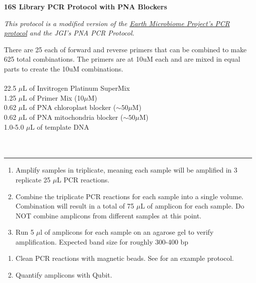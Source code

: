 \documentclass[11pt]{article}
\begin{document}
\begin{center}
\textbf{\large{16S Library PCR Protocol with PNA Blockers}}
\break

\emph{This protocol is a modified version of the \href{http://www.earthmicrobiome.org/emp-standard-protocols/16s/}{Earth Microbiome Project's PCR protocol} and the JGI's PNA PCR Protocol.}
\end{center}

There are 25 each of forward and reverse primers that can be combined to make 625 total combinations. The primers are at 10uM each and are mixed in equal parts to create the 10uM combinations. \\

 \\
\hfill
22.5 $\mu$L of Invitrogen Platinum SuperMix \\
\hfill
1.25 $\mu$L of Primer Mix (10$\mu$M)\\
\hfill
0.62 $\mu$L of PNA chloroplast blocker ($\sim50\mu$M)\\
\hfill
0.62 $\mu$L of PNA mitochondria blocker ($\sim50\mu$M)\\
\hfill
1.0-5.0 $\mu$L of template DNA
\\
\\
\\
\rule{\textwidth}{1pt} %
\medskip \break
{}
\begin{enumerate}
\item Amplify samples in triplicate, meaning each sample will be amplified in 3 replicate 25 $\mu$L PCR reactions.
\item Combine the triplicate PCR reactions for each sample into a single volume. Combination will result in a total of 75 $\mu$L of amplicon for each sample. Do NOT combine amplicons from different samples at this point.
\item Run 5 $\mu$l of amplicons for each sample on an agarose gel to verify amplification. Expected band size for roughly 300-400 bp
\end{enumerate}
\begin{enumerate}[resume]
\item{Clean PCR reactions with magnetic beads. See  for an example protocol.}
\item Quantify amplicons with Qubit.
\end{enumerate}
\end{document}
